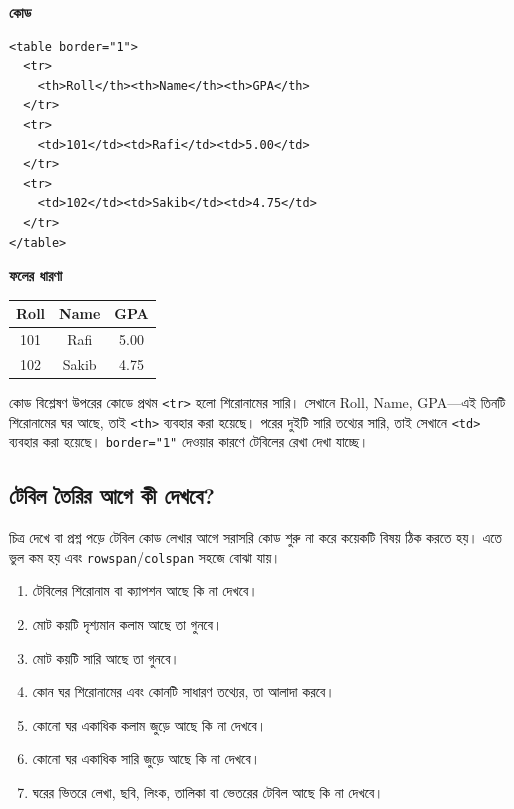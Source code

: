 \par\noindent
\begin{minipage}[t]{.50\linewidth}\vspace{0pt}\small
\textbf{\color{chFourTeal}কোড}\par
\begin{verbatim}
<table border="1">
  <tr>
    <th>Roll</th><th>Name</th><th>GPA</th>
  </tr>
  <tr>
    <td>101</td><td>Rafi</td><td>5.00</td>
  </tr>
  <tr>
    <td>102</td><td>Sakib</td><td>4.75</td>
  </tr>
</table>
\end{verbatim}
\par\smallskip
\end{minipage}\hfill
\begin{minipage}[t]{.46\linewidth}\vspace{0pt}\small
\textbf{\color{chFourTeal}ফলের ধারণা}\par
\begin{center}
\begin{tabular}{|c|c|c|}
\hline
\textbf{Roll} & \textbf{Name} & \textbf{GPA} \\
\hline
101 & Rafi & 5.00 \\
\hline
102 & Sakib & 4.75 \\
\hline
\end{tabular}
\end{center}
\par\smallskip
\end{minipage}\par


\begin{boardbox}{কোড বিশ্লেষণ}
উপরের কোডে প্রথম \texttt{<tr>} হলো শিরোনামের সারি। সেখানে Roll, Name, GPA—এই তিনটি শিরোনামের ঘর আছে, তাই \texttt{<th>} ব্যবহার করা হয়েছে। পরের দুইটি সারি তথ্যের সারি, তাই সেখানে \texttt{<td>} ব্যবহার করা হয়েছে। \texttt{border="1"} দেওয়ার কারণে টেবিলের রেখা দেখা যাচ্ছে।
\end{boardbox}

\subsection{টেবিল তৈরির আগে কী দেখবে?}

চিত্র দেখে বা প্রশ্ন পড়ে টেবিল কোড লেখার আগে সরাসরি কোড শুরু না করে কয়েকটি বিষয় ঠিক করতে হয়। এতে ভুল কম হয় এবং \texttt{rowspan}/\texttt{colspan} সহজে বোঝা যায়।

\begin{enumerate}
\item টেবিলের শিরোনাম বা ক্যাপশন আছে কি না দেখবে।
\item মোট কয়টি দৃশ্যমান কলাম আছে তা গুনবে।
\item মোট কয়টি সারি আছে তা গুনবে।
\item কোন ঘর শিরোনামের এবং কোনটি সাধারণ তথ্যের, তা আলাদা করবে।
\item কোনো ঘর একাধিক কলাম জুড়ে আছে কি না দেখবে।
\item কোনো ঘর একাধিক সারি জুড়ে আছে কি না দেখবে।
\item ঘরের ভিতরে লেখা, ছবি, লিংক, তালিকা বা ভেতরের টেবিল আছে কি না দেখবে।
\end{enumerate}

